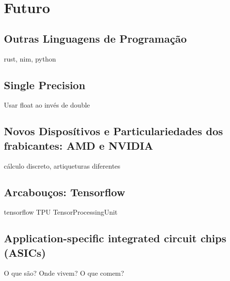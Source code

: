 \chapter{Futuro}
\label{cap:futuro}

\section{Outras Linguagens de Programação}
  rust, nim, python

\section{Single Precision}
  Usar float ao invés de double

\section{Novos Disposítivos e Particulariedades dos frabicantes: AMD e NVIDIA}
  cálculo discreto, artiqueturas diferentes

\section{Arcabouços: Tensorflow}
  tensorflow
  TPU TensorProcessingUnit

\section{Application-specific integrated circuit chips (ASICs)}
  O que são? Onde vivem? O que comem?

